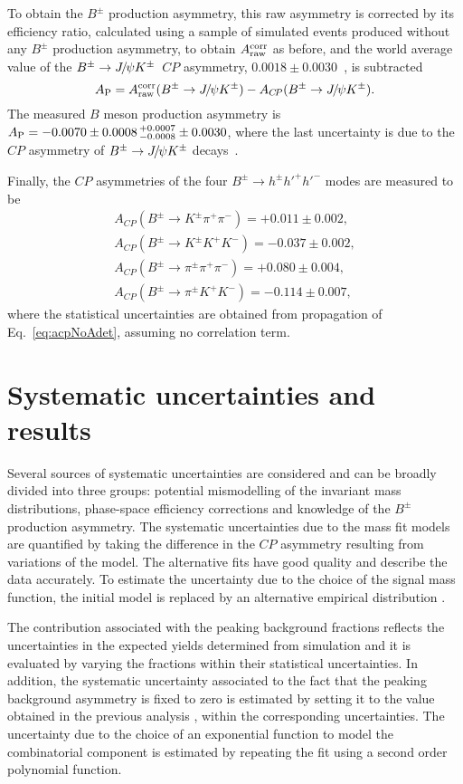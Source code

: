 \documentclass[12pt,a4paper]{article}
\def\Ppi         {\ensuremath{\uppi}\xspace}
\def\Ppsi        {\ensuremath{\uppsi}\xspace}
\def\PB      {\ensuremath{\mathrm{B}}\xspace}
\def\PJ      {\ensuremath{\mathrm{J}}\xspace}
\def\PK      {\ensuremath{\mathrm{K}}\xspace}
\def\Ph      {\ensuremath{\mathrm{h}}\xspace}
\def\Ppi         {\ensuremath{\pi}\xspace}
\def\Ppsi        {\ensuremath{\psi}\xspace}
\def\PB      {\ensuremath{B}\xspace}
\def\PJ      {\ensuremath{J}\xspace}
\def\PK      {\ensuremath{K}\xspace}
\def\Ph      {\ensuremath{h}\xspace}
\def\pion   {{\ensuremath{\Ppi}}\xspace}
\def\pip    {{\ensuremath{\pion^+}}\xspace}
\def\pim    {{\ensuremath{\pion^-}}\xspace}
\def\pipm   {{\ensuremath{\pion^\pm}}\xspace}
\def\kaon    {{\ensuremath{\PK}}\xspace}
\def\Kp      {{\ensuremath{\kaon^+}}\xspace}
\def\Km      {{\ensuremath{\kaon^-}}\xspace}
\def\Kpm     {{\ensuremath{\kaon^\pm}}\xspace}
\def\B       {{\ensuremath{\PB}}\xspace}
\def\Bpm     {{\ensuremath{\B^\pm}}\xspace}
\def\jpsi     {{\ensuremath{{\PJ\mskip -3mu/\mskip -2mu\Ppsi}}}\xspace}
\newcommand{\decay}[2]{\ensuremath{#1\!\to #2}\xspace}
\def\to                 {\ensuremath{\rightarrow}\xspace}
\def\CP                {{\ensuremath{C\!P}}\xspace}
\def\Bhhh        {\decay{\Bpm}{\Ph^{\pm} \Ph'^+\Ph'^-}}
\def\pipipi {\ensuremath{{\Bpm \to \pipm \pip \pim}}\xspace}
\def\kpipi {\ensuremath{{\Bpm \to \Kpm \pip \pim}}\xspace}
\def\kkpi {\ensuremath{{\Bpm \to \pipm \Kp \Km }}\xspace}
\def\kkk {\ensuremath{{\Bpm \to \Kpm \Kp \Km}}\xspace}
\def\jpsik {\ensuremath{{\Bpm \to \jpsi \Kpm}}\xspace}
\def\acp {\ensuremath{A_{\CP}}\xspace}
\def\acprawacc {\ensuremath{A_{\rm raw}^{\rm corr}}\xspace}
\def\aprod {\ensuremath{A_{\rm P}}\xspace}
\begin{document}
To obtain the $B^{\pm}$ production asymmetry, this raw asymmetry is corrected by its efficiency ratio, calculated using a sample of simulated events produced without any $B^{\pm}$ production asymmetry, to obtain \acprawacc as before, and the world average value of the \jpsik\ \CP asymmetry, $0.0018 \pm 0.0030$~\cite{PDG2020}, is subtracted
\begin{equation}
\aprod = \acprawacc(\jpsik)-\acp(\jpsik).
\label{eq:aprod}
\end{equation} 
The measured \B meson production asymmetry is \mbox{$\aprod = -0.0070 \pm 0.0008\,^{+0.0007}_{-0.0008} \pm 0.0030$}, where the last uncertainty is due to the \CP asymmetry of \jpsik decays~\cite{PDG2020}. 

Finally, the \CP asymmetries of the four \Bhhh modes are measured to be
\begin{align}
\acp(\kpipi)  = +0.011 \pm 0.002, \nonumber \\
\acp(\kkk)    = -0.037 \pm 0.002, \nonumber \\
\acp(\pipipi) = +0.080 \pm 0.004, \nonumber \\
\acp(\kkpi)   = -0.114 \pm 0.007, \nonumber
\end{align}
where the statistical uncertainties are  obtained from propagation of Eq.~\eqref{eq:acpNoAdet}, assuming no correlation term. 



\section{Systematic uncertainties and results}
\label{sec:systematics}

Several sources of systematic uncertainties are considered and can be broadly divided into three groups: potential mismodelling of the invariant mass distributions, phase-space efficiency corrections and knowledge of the $B^{\pm}$ production asymmetry. The systematic uncertainties due to the mass fit models are quantified by taking the difference in the \CP asymmetry resulting from variations of the model. The alternative fits have good quality and describe the data accurately. To estimate the uncertainty due to the choice of the signal mass function, the initial model is replaced by an alternative empirical distribution \cite{das2016simple}. 

The contribution associated with the peaking background fractions reflects the uncertainties in the expected yields determined from simulation and it is evaluated by varying the fractions within their statistical uncertainties. 
In addition, the systematic uncertainty associated to the fact that the peaking background asymmetry is fixed to zero is estimated by setting it to the value obtained in the previous analysis \cite{LHCb-PAPER-2014-044}, within the corresponding uncertainties. 
The uncertainty due to the choice of an exponential function to model the combinatorial component is estimated by repeating the fit using a second order polynomial function.
\end{document}
